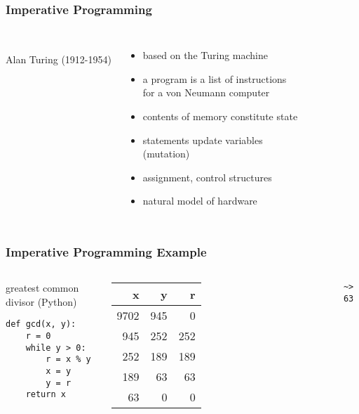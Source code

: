 \documentclass[dvipsnames]{beamer}
\theoremstyle{plain}
\begin{document}
\begin{frame}
  \frametitle{Imperative Programming}

  \begin{columns}
    \begin{center}
      \\
      Alan Turing (1912-1954)
    \end{center}

    \begin{itemize}
      \item based on the Turing machine
      \item a program is a list of instructions\\
        for a von Neumann computer
      \item contents of memory constitute \alert{state}

      \pause
      \medskip
      \item statements update variables\\
        (\alert{mutation})
      \item assignment, control structures
      \item natural model of hardware
    \end{itemize}
  \end{columns}
\end{frame}

\begin{frame}[fragile]
  \frametitle{Imperative Programming Example}

  \begin{columns}[b]
    \begin{exampleblock}{greatest common divisor (Python)}
      \begin{lstlisting}
def gcd(x, y):
    r = 0
    while y > 0:
        r = x % y
        x = y
        y = r
    return x
      \end{lstlisting}
    \end{exampleblock}

    \begin{tabular}{|r|r|r|}\hline
   x &   y &   r\\\hline\hline
9702 & 945 &   0\\\hline
 945 & 252 & 252\\\hline
 252 & 189 & 189\\\hline
 189 &  63 &  63\\\hline
  63 &   0 &   0\\\hline
    \end{tabular}

    \medskip
    \lstinline{~> 63}
  \end{columns}
\end{frame}
\end{document}
